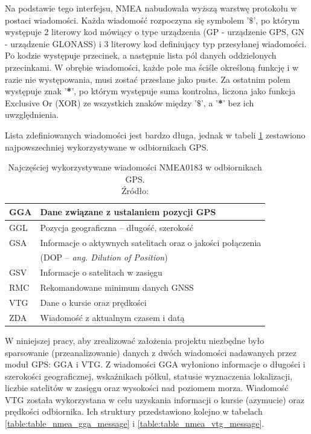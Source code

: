 Na podstawie tego interfejsu, NMEA nabudowała wyższą warstwę protokołu w postaci wiadomości. Każda wiadomość rozpoczyna się symbolem '\textbf{$\$$}', po którym występuje 2 literowy kod mówiący o type urządzenia (GP - urządzenie GPS, GN - urządzenie GLONASS) i 3 literowy kod definiujący typ przesyłanej wiadomości. Po kodzie występuje przecinek, a następnie lista pól danych oddzielonych przecinkami. W obrębie wiadomości, każde pole ma ściśle określoną funkcję i w razie nie występowania, musi zostać przesłane jako puste. Za ostatnim polem występuje znak '\textbf{*}', po którym występuje suma kontrolna, liczona jako funkcja Exclusive Or (XOR) ze wszystkich znaków między '\textbf{$\$$}', a '\textbf{*}' bez ich uwzględnienia. 

Lista zdefiniowanych wiadomości jest bardzo długa, jednak w tabeli \ref{table:table_nmea_messages} zestawiono najpowszechniej wykorzystywane w odbiornikach GPS.

\begin{table}[H]
\centering
\caption{Najczęściej wykorzystywane wiadomości NMEA0183 w odbiornikach GPS.\\ Źródło: \cite{inzynierka}}
\label{table:table_nmea_messages}
\begin{tabular}{| l | l |}
\hline
GGA & Dane związane z ustalaniem pozycji GPS \\  \hline
GGL & Pozycja geograficzna – długość, szerokość \\  \hline
GSA & Informacje o aktywnych satelitach oraz o jakości połączenia \\ 
    & (DOP – \textit{ang.    Dilution of Position}) \\ \hline
GSV & Informacje o satelitach w zasięgu \\ \hline
RMC & Rekomandowane minimum danych GNSS \\ \hline
VTG & Dane o kursie oraz prędkości \\ \hline
ZDA & Wiadomość z aktualnym czasem i datą \\ \hline
\end{tabular}
\end{table}

W niniejszej pracy, aby zrealizować założenia projektu niezbędne było sparsowanie (przeanalizowanie) danych z dwóch wiadomości nadawanych przez moduł GPS: GGA i VTG.
Z wiadomości GGA  wyłoniono informacje o długości i szerokości geograficznej, wskaźnikach półkul, statusie wyznaczenia lokalizacji, liczbie satelitów w zasięgu oraz wysokości nad poziomem morza. Wiadomość VTG została wykorzystana w celu uzyskania informacji o kursie (azymucie) oraz prędkości odbiornika. Ich struktury przedstawiono kolejno w tabelach \ref{table:table_nmea_gga_message} i \ref{table:table_nmea_vtg_message}.

